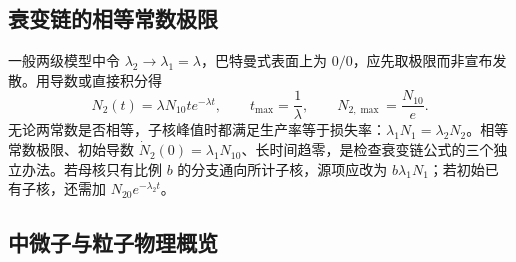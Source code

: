 \subsection{衰变链的相等常数极限}
一般两级模型中令 $\lambda_2\to\lambda_1=\lambda$，巴特曼式表面上为 $0/0$，应先取极限而非宣布发散。用导数或直接积分得
\[
 N_2(t)=\lambda N_{10}t e^{-\lambda t},\qquad
 t_{\max}=\frac1\lambda,\qquad N_{2,\max}=\frac{N_{10}}e.
\]
无论两常数是否相等，子核峰值时都满足生产率等于损失率：$\lambda_1N_1=\lambda_2N_2$。相等常数极限、初始导数 $\dot N_2(0)=\lambda_1N_{10}$、长时间趋零，是检查衰变链公式的三个独立办法。若母核只有比例 $b$ 的分支通向所计子核，源项应改为 $b\lambda_1N_1$；若初始已有子核，还需加 $N_{20}e^{-\lambda_2t}$。

\subsection{中微子与粒子物理概览}



\hypersetup{bookmarksdepth=2}

\endgroup
